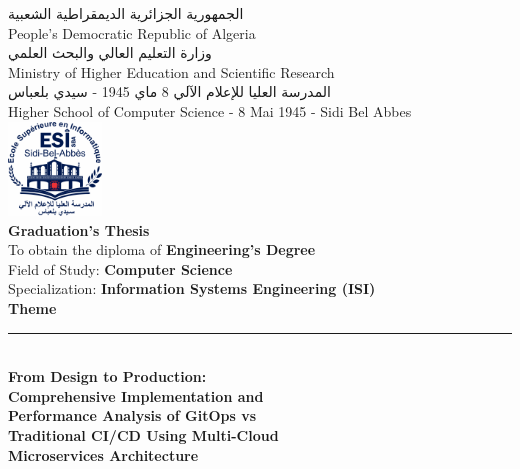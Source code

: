 \thispagestyle{empty}

\begin{center}

{\footnotesize \textarabic{الجمهورية الجزائرية الديمقراطية الشعبية}} \\[0.05cm]
{\footnotesize People's Democratic Republic of Algeria} \\[0.1cm]

{\footnotesize \textarabic{وزارة التعليم العالي والبحث العلمي}} \\[0.05cm]
{\footnotesize Ministry of Higher Education and Scientific Research} \\[0.1cm]

{\footnotesize \textarabic{المدرسة العليا للإعلام الآلي 8 ماي 1945 - سيدي بلعباس}} \\[0.05cm]
{\footnotesize Higher School of Computer Science - 8 Mai 1945 - Sidi Bel Abbes} \\[0.2cm]

\includegraphics[width=2.5cm]{figures/logos/esi-sba-logo.png} \\[0.15cm]

{\Large \textbf{Graduation's Thesis}} \\[0.3cm]

{\small To obtain the diploma of \textbf{Engineering's Degree}} \\[0.1cm]
{\small Field of Study: \textbf{Computer Science}} \\[0.1cm]
{\small Specialization: \textbf{Information Systems Engineering (ISI)}} \\[0.4cm]

{\large \textbf{Theme}} \\[0.2cm]
\rule{13cm}{0.5pt} \\[0.3cm]

{\LARGE \textbf{From Design to Production:}} \\[0.3cm]
{\LARGE \textbf{Comprehensive Implementation and}} \\[0.3cm]
{\LARGE \textbf{Performance Analysis of GitOps vs}} \\[0.3cm]
{\LARGE \textbf{Traditional CI/CD Using Multi-Cloud}} \\[0.3cm]
{\LARGE \textbf{Microservices Architecture}} \\[0.5cm]


\end{center}
